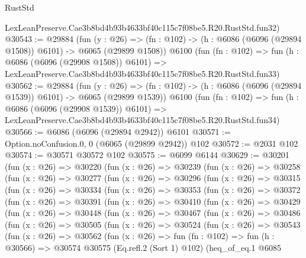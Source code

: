 \begin{lexlean}{RustStd}
\begin{coremodule}
    LexLeanPreserve.Cae3b8bd4b93b4633bf40c115c7f08be5.R20.RustStd.fun32)
@30543 := @29884
    (fun (y : @26) =>
    (fn : @102) -> (h : @6086 (@6096 (@29894 @1508)) @6101) -> @6065 (@29899 @1508))
    @6100
    (fun (fn : @102) =>
    fun (h : @6086 (@6096 (@29908 @1508)) @6101) =>
    LexLeanPreserve.Cae3b8bd4b93b4633bf40c115c7f08be5.R20.RustStd.fun33)
@30562 := @29884
    (fun (y : @26) =>
    (fn : @102) -> (h : @6086 (@6096 (@29894 @1539)) @6101) -> @6065 (@29899 @1539))
    @6100
    (fun (fn : @102) =>
    fun (h : @6086 (@6096 (@29908 @1539)) @6101) =>
    LexLeanPreserve.Cae3b8bd4b93b4633bf40c115c7f08be5.R20.RustStd.fun34)
@30566 := @6086 (@6096 (@29894 @2942)) @6101
@30571 := Option.noConfusion.{0, 0} (@6065 (@29899 @2942)) @102
@30572 := @2031 @102
@30574 := @30571 @30572 @102
@30575 := @6099 @6144
@30629 := @30201
    (fun (x : @26) =>
    @30220
      (fun (x : @26) =>
      @30239
        (fun (x : @26) =>
        @30258
          (fun (x : @26) =>
          @30277
            (fun (x : @26) =>
            @30296
              (fun (x : @26) =>
              @30315
                (fun (x : @26) =>
                @30334
                  (fun (x : @26) =>
                  @30353
                    (fun (x : @26) =>
                    @30372
                      (fun (x : @26) =>
                      @30391
                        (fun (x : @26) =>
                        @30410
                          (fun (x : @26) =>
                          @30429
                            (fun (x : @26) =>
                            @30448
                              (fun (x : @26) =>
                              @30467
                                (fun (x : @26) =>
                                @30486
                                  (fun (x : @26) =>
                                  @30505
                                    (fun (x : @26) =>
                                    @30524
                                      (fun (x : @26) =>
                                      @30543
                                        (fun (x : @26) =>
                                        @30562
                                          (fun (x : @26) =>
                                          fun (fn : @102) =>
                                          fun (h : @30566) =>
                                          @30574
                                            @30575
                                            (Eq.refl.{2} (Sort 1) @102)
                                            (heq_of_eq.{1}
                                              @6085

\end{coremodule}
\end{lexlean}
